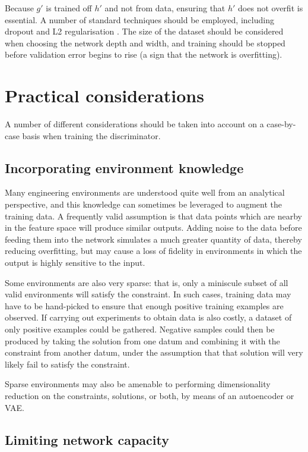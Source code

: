\documentclass[../../main.tex]{subfiles}
\begin{document}
Because $g'$ is trained off $h'$ and not from data, ensuring that $h'$ does not overfit is essential.
A number of standard techniques should be employed, including dropout \cite{srivastava14} and L2 regularisation \cite{krogh92}.
The size of the dataset should be considered when choosing the network depth and width, and training should be stopped before validation error begins to rise (a sign that the network is overfitting).

\section{Practical considerations} \label{section:practicalConsiderations}

A number of different considerations should be taken into account on a case-by-case basis when training the discriminator.

\subsection{Incorporating environment knowledge} \label{subsection:incorporatingEnvironmentKnowledge}

Many engineering environments are understood quite well from an analytical perspective, and this knowledge can sometimes be leveraged to augment the training data.
A frequently valid assumption is that data points which are nearby in the feature space will produce similar outputs.
Adding noise to the data before feeding them into the network simulates a much greater quantity of data, thereby reducing overfitting, but may cause a loss of fidelity in environments in which the output is highly sensitive to the input.

Some environments are also very sparse: that is, only a miniscule subset of all valid environments will satisfy the constraint.
In such cases, training data may have to be hand-picked to ensure that enough positive training examples are observed.
If carrying out experiments to obtain data is also costly, a dataset of only positive examples could be gathered.
Negative samples could then be produced by taking the solution from one datum and combining it with the constraint from another datum, under the assumption that that solution will very likely fail to satisfy the constraint.

Sparse environments may also be amenable to performing dimensionality reduction on the constraints, solutions, or both, by means of an autoencoder or VAE.

\subsection{Limiting network capacity} \label{subsection:limitingNetworkCapacity}
\end{document}
